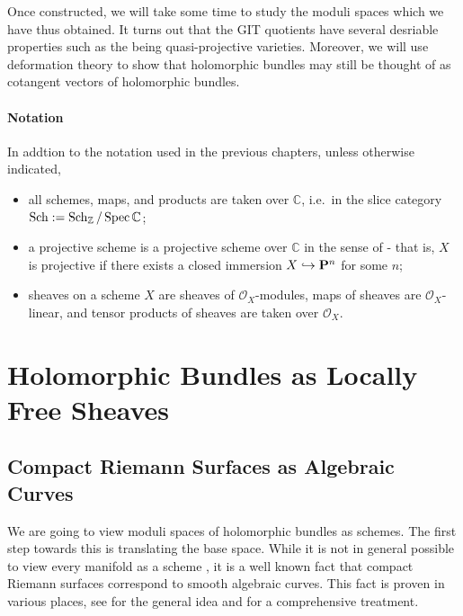 \documentclass[12pt]{ociamthesis}  %
\begin{document}
Once constructed, we will take some time to study the moduli
spaces which we have thus obtained. It turns out that the GIT
quotients have several desriable properties such as the being
quasi-projective varieties. Moreover, we will use deformation
theory to show that holomorphic bundles may still be thought
of as cotangent vectors of holomorphic bundles.

\paragraph*{Notation}

In addtion to the notation used in the previous chapters, unless
otherwise indicated,
\begin{itemize}
  \item all schemes, maps, and products are taken over $\mathbb{C}$,
        i.e.~in the slice category
        $\operatorname{Sch} := \operatorname{Sch}_{\mathbb{Z}}/\operatorname{Spec}\mathbb{C}$;
  \item a projective scheme is a projective scheme over $\mathbb{C}$
        in the sense of \cite{hartshorne1977} - that is, $X$ is projective
        if there exists a closed immersion $X\hookrightarrow\mathbf{P}^{n}_{}$ for
        some $n$;
  \item sheaves on a scheme $X$ are sheaves of $\mathscr O_X$-modules,
        maps of sheaves are $\mathscr O_X$-linear, and tensor products
        of sheaves are taken over $\mathscr O_X$.
\end{itemize}

\section{Holomorphic Bundles as Locally Free Sheaves}

\missingsection

\subsection{Compact Riemann Surfaces as Algebraic Curves}
\label{sec:surfaces_as_curves}

We are going to view moduli spaces of holomorphic bundles
as schemes. The first step towards this is translating the
base space. While it is not in general possible to view
every manifold as a scheme \missingcitation, it is a well
known fact that compact Riemann surfaces correspond to smooth
algebraic curves.
This fact is proven in various places, see \cite[215]{griffiths1994}
for the general idea and \cite[5-16]{harris2011}
for a comprehensive treatment.
\end{document}
